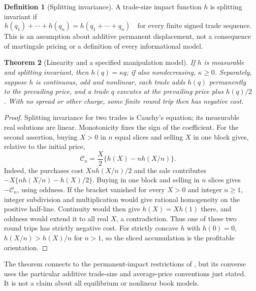 \documentclass[11pt]{article}
\numberwithin{equation}{section}
\newtheorem{theorem}{Theorem}[section]
\theoremstyle{definition}
\newtheorem{definition}[theorem]{Definition}
\theoremstyle{remark}
\theoremstyle{definition}
\begin{document}
\begin{definition}[Splitting invariance]
A trade-size impact function $h$ is splitting invariant if
\begin{equation}\label{eq:splitting}
 h(q_1)+\cdots+h(q_n)=h(q_1+\cdots+q_n)
 \quad\text{for every finite signed trade sequence.}
\end{equation}
This is an assumption about additive permanent displacement, not a consequence
of martingale pricing or a definition of every informational model.
\end{definition}

\begin{theorem}[Linearity and a specified manipulation model]\label{thm:cauchy}
If $h$ is measurable and splitting invariant, then $h(q)=\kappa q$; if also
nondecreasing, $\kappa\geq0$. Separately, suppose $h$ is continuous, odd and
nonlinear, each trade adds $h(q)$ permanently to the prevailing price, and a
trade $q$ executes at the prevailing price plus $h(q)/2$. With no spread or
other charge, some finite round trip then has negative cost.
\end{theorem}
\begin{proof}
Splitting invariance for two trades is Cauchy's equation; its measurable real
solutions are linear. Monotonicity fixes the sign of the coefficient.
For the second assertion, buying $X>0$ in $n$ equal slices and selling $X$ in
one block gives, relative to the initial price,
\begin{equation}\label{eq:roundtrip}
 \mathcal C_n=\frac X2\{h(X)-nh(X/n)\}.
\end{equation}
Indeed, the purchases cost $Xnh(X/n)/2$ and the sale contributes
$-X\{nh(X/n)-h(X)/2\}$. Buying in one block and selling in $n$ slices gives
$-\mathcal C_n$, using oddness. If the bracket vanished for every $X>0$ and
integer $n\geq1$, integer subdivision and multiplication would give rational
homogeneity on the positive half-line. Continuity would then give
$h(X)=Xh(1)$ there, and oddness would extend it to all real $X$, a
contradiction. Thus one of these two round trips has strictly negative cost.
For strictly concave $h$ with $h(0)=0$, $h(X/n)>h(X)/n$ for $n>1$,
so the sliced accumulation is the profitable orientation.
\end{proof}

The theorem connects to the permanent-impact restrictions of
\citet{hubermanstanzl2004}, but its converse uses the particular additive
trade-size and average-price conventions just stated. It is not a claim about
all equilibrium or nonlinear book models.
\end{document}
